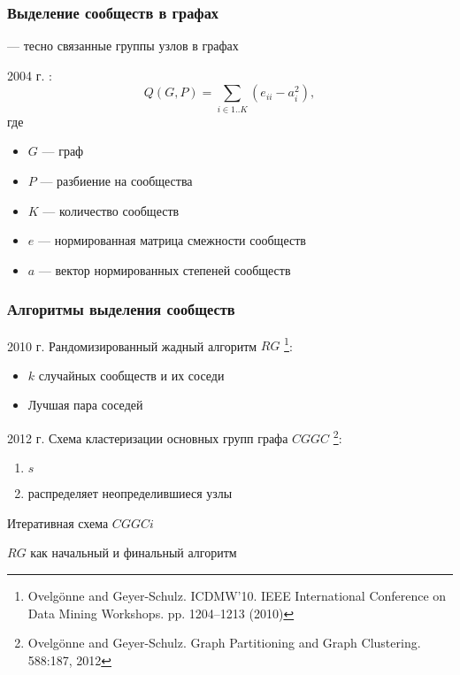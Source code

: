 \begin{frame}
	\frametitle{Выделение сообществ в графах}
	 --- тесно связанные группы узлов в графах

	2004 г. :
	$$Q(G, P) = \sum_{i \in 1..K}{\left(e_{ii} - a_i^2\right)},$$
	где
	\begin{itemize} 
		\item $G$ --- граф
		\item $P$ --- разбиение на сообщества
		\item $K$ --- количество сообществ
		\item $e$ --- нормированная матрица смежности сообществ
		\item $a$ --- вектор нормированных степеней сообществ
	\end{itemize}
\end{frame}


\begin{frame}
	\frametitle{Алгоритмы выделения сообществ}


	2010 г. Рандомизированный жадный алгоритм $RG$%
	\footnote{\scriptsize Ovelg{\"o}nne and Geyer-Schulz.  ICDMW'10. IEEE International Conference on Data Mining Workshops. pp. 1204–1213 (2010)}:
	\begin{itemize}
		\item $k$ случайных сообществ и их соседи
		\item Лучшая пара соседей
	\end{itemize}\vspace{.5em}

	2012 г. Схема кластеризации основных групп графа $CGGC$%
	\footnote{\scriptsize Ovelg{\"o}nne and Geyer-Schulz.  Graph Partitioning and Graph Clustering. 588:187, 2012}:
	\begin{enumerate}
		\item $s$ 
		\item {} распределяет неопределившиеся узлы
	\end{enumerate}\vspace{.5em}

	Итеративная схема $CGGCi$ \vspace{.5em}

	$RG$ как начальный и финальный алгоритм
\end{frame}


